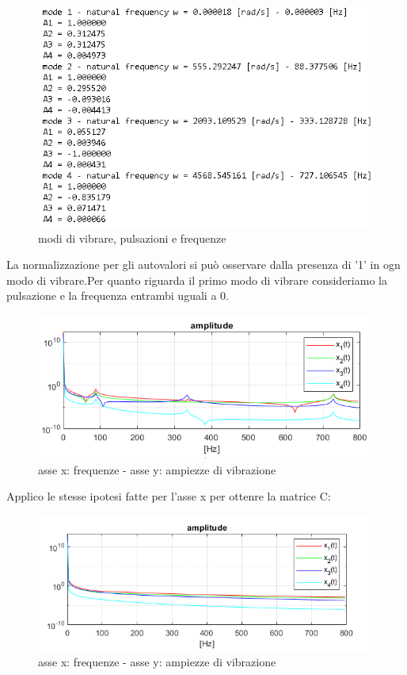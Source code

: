 \documentclass{article}
\begin{document}
\begin{figure}[H]
\centering
\includegraphics[width=.8\textwidth]{./assey/modi.png}
\caption{modi di vibrare, pulsazioni e frequenze}
\end{figure}
La normalizzazione per gli autovalori si può osservare dalla presenza di '1' in ogn modo di vibrare.Per quanto riguarda il primo modo di vibrare consideriamo la pulsazione e la frequenza entrambi uguali a 0.
\begin{figure}[H]
\centering
\includegraphics[width=.8\textwidth]{./assey/plot_c0.png}
\caption{ asse x: frequenze - asse y: ampiezze di vibrazione}
\end{figure}
Applico le stesse ipotesi fatte per l'asse x per ottenre la matrice C:
\begin{figure}[H]
\centering
\includegraphics[width=.8\textwidth]{./assex/plot_c.png}
\caption{ asse x: frequenze - asse y: ampiezze di vibrazione}
\end{figure}
\end{document}
